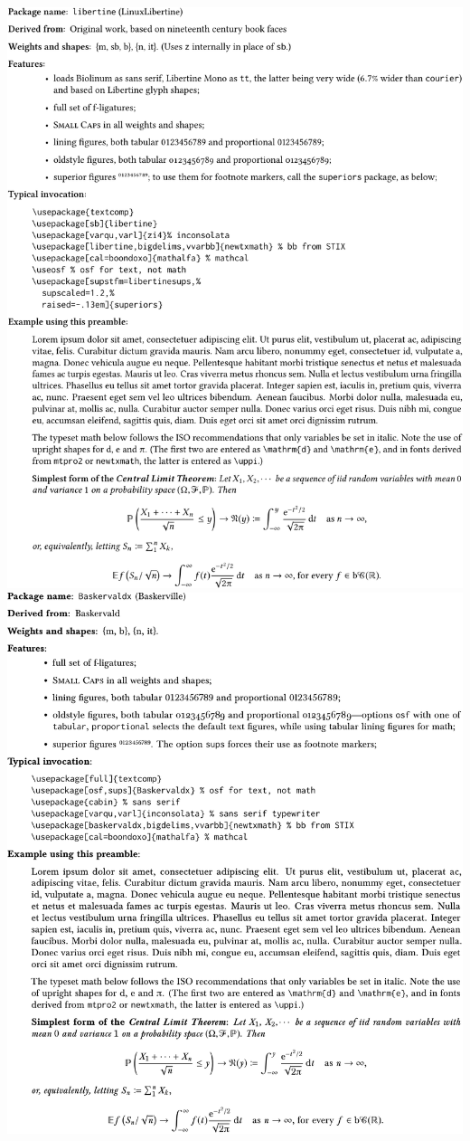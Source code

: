 \documentclass{article}
\begin{document}
\newpage
\hypertarget{lnk:libertine}{}
\includegraphics{libsamp-crop}
\newpage
\hypertarget{lnk:baskervaldx}{}
\includegraphics{zbvsamp-crop}
\end{document}
